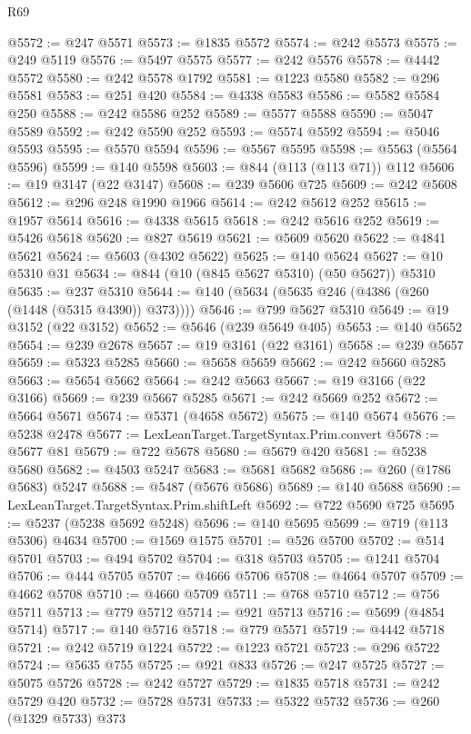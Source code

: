 \begin{lexlean}{R69}
\begin{coremodule}
{@5572 := @247 @5571
@5573 := @1835 @5572
@5574 := @242 @5573
@5575 := @249 @5119
@5576 := @5497 @5575
@5577 := @242 @5576
@5578 := @4442 @5572
@5580 := @242 @5578 @1792
@5581 := @1223 @5580
@5582 := @296 @5581
@5583 := @251 @420
@5584 := @4338 @5583
@5586 := @5582 @5584 @250
@5588 := @242 @5586 @252
@5589 := @5577 @5588
@5590 := @5047 @5589
@5592 := @242 @5590 @252
@5593 := @5574 @5592
@5594 := @5046 @5593
@5595 := @5570 @5594
@5596 := @5567 @5595
@5598 := @5563 (@5564 @5596)
@5599 := @140 @5598
@5603 := @844 (@113 (@113 @71)) @112
@5606 := @19 @3147 (@22 @3147)
@5608 := @239 @5606 @725
@5609 := @242 @5608
@5612 := @296 @248 @1990 @1966
@5614 := @242 @5612 @252
@5615 := @1957 @5614
@5616 := @4338 @5615
@5618 := @242 @5616 @252
@5619 := @5426 @5618
@5620 := @827 @5619
@5621 := @5609 @5620
@5622 := @4841 @5621
@5624 := @5603 (@4302 @5622)
@5625 := @140 @5624
@5627 := @10 @5310 @31
@5634 := @844 (@10 (@845 @5627 @5310) (@50 @5627)) @5310
@5635 := @237 @5310
@5644 := @140 (@5634 (@5635 @246 (@4386 (@260 (@1448 (@5315 @4390)) @373))))
@5646 := @799 @5627 @5310
@5649 := @19 @3152 (@22 @3152)
@5652 := @5646 (@239 @5649 @405)
@5653 := @140 @5652
@5654 := @239 @2678
@5657 := @19 @3161 (@22 @3161)
@5658 := @239 @5657
@5659 := @5323 @5285
@5660 := @5658 @5659
@5662 := @242 @5660 @5285
@5663 := @5654 @5662
@5664 := @242 @5663
@5667 := @19 @3166 (@22 @3166)
@5669 := @239 @5667 @5285
@5671 := @242 @5669 @252
@5672 := @5664 @5671
@5674 := @5371 (@4658 @5672)
@5675 := @140 @5674
@5676 := @5238 @2478
@5677 := LexLeanTarget.TargetSyntax.Prim.convert
@5678 := @5677 @81
@5679 := @722 @5678
@5680 := @5679 @420
@5681 := @5238 @5680
@5682 := @4503 @5247
@5683 := @5681 @5682
@5686 := @260 (@1786 @5683) @5247
@5688 := @5487 (@5676 @5686)
@5689 := @140 @5688
@5690 := LexLeanTarget.TargetSyntax.Prim.shiftLeft
@5692 := @722 @5690 @725
@5695 := @5237 (@5238 @5692 @5248)
@5696 := @140 @5695
@5699 := @719 (@113 @5306) @4634
@5700 := @1569 @1575
@5701 := @526 @5700
@5702 := @514 @5701
@5703 := @494 @5702
@5704 := @318 @5703
@5705 := @1241 @5704
@5706 := @444 @5705
@5707 := @4666 @5706
@5708 := @4664 @5707
@5709 := @4662 @5708
@5710 := @4660 @5709
@5711 := @768 @5710
@5712 := @756 @5711
@5713 := @779 @5712
@5714 := @921 @5713
@5716 := @5699 (@4854 @5714)
@5717 := @140 @5716
@5718 := @779 @5571
@5719 := @4442 @5718
@5721 := @242 @5719 @1224
@5722 := @1223 @5721
@5723 := @296 @5722
@5724 := @5635 @755
@5725 := @921 @833
@5726 := @247 @5725
@5727 := @5075 @5726
@5728 := @242 @5727
@5729 := @1835 @5718
@5731 := @242 @5729 @420
@5732 := @5728 @5731
@5733 := @5322 @5732
@5736 := @260 (@1329 @5733) @373
}
\end{coremodule}
\end{lexlean}
